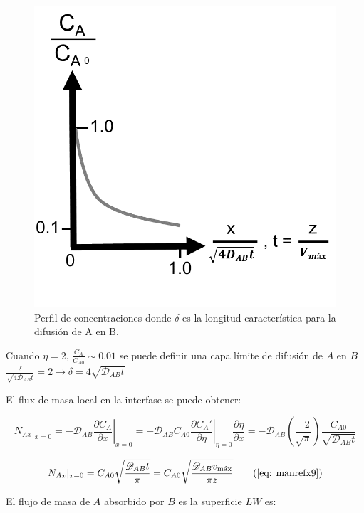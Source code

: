  \begin{figure}[H]
 	\centering
 	\includegraphics[scale=0.3]{./Capitulo2/Imagenes/fig-2-5.PNG}
 	\caption{Perfil de concentraciones donde $\delta$ es la longitud característica para la difusión de A en B.}
 \end{figure}
 
 Cuando $\eta = 2$, $\frac{C_A}{C_{A0}} \sim 0.01$ se puede definir una capa límite de difusión de $A$ en $B$ $\frac{\delta}{\sqrt{4\mathscr{D}_{AB}t}} = 2 \to \delta = 4 \sqrt{\mathscr{D}_{AB}t}$
 
 El flux de masa local en la interfase se puede obtener:
 
 $$N_{Ax}|_{x=0} = -\mathscr{D}_{AB} \left. \frac{\partial C_A}{\partial x} \right|_{x=0} = -\mathscr{D}_{AB} C_{A0} \left. \frac{\partial C_A'}{\partial \eta} \right| _{\eta = 0} \frac{\partial \eta}{\partial x} = -\mathscr{D}_{AB} \left( \frac{-2}{\sqrt{\pi}} \right) \frac{C_{A0}}{\sqrt{\mathscr{D}_{AB}t}}$$
 
 \begin{equation}
 	N_{Ax}|_{x=0} = C_{A0} \sqrt{\frac{\mathscr{D}_{AB}t}{\pi}} = C_{A0} \sqrt{ \frac{\mathscr{D}_{AB} v_{\text{máx}}}{\pi z}}
 	\tag{\eqref{eq: manrefx9}}
 \end{equation}
 
 El flujo de masa de $A$ absorbido por $B$ es la superficie $LW$ es:
 
